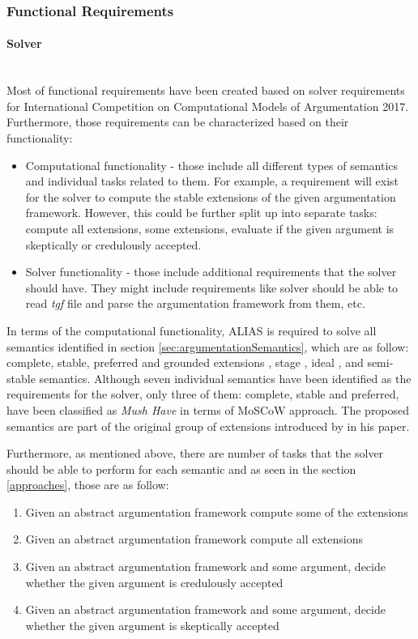 \subsubsection{Functional Requirements}

\paragraph{Solver} \mbox{} \\

Most of functional requirements have been created based on solver requirements for International Competition on Computational Models of Argumentation 2017. Furthermore, those requirements can be characterized based on their functionality:
\begin{itemize}
	\item Computational functionality - those include all different types of semantics and individual tasks related to them. For example, a requirement will exist for the solver to compute the stable extensions of the given argumentation framework. However, this could be further split up into separate tasks: compute all extensions, some extensions, evaluate if the given argument is skeptically or credulously accepted.
	\item Solver functionality - those include additional requirements that the solver should have. They might include requirements like solver should be able to read \textit{tgf} file and parse the argumentation framework from them, etc.
\end{itemize}

In terms of the computational functionality, ALIAS is required to solve all semantics identified in section \ref{sec:argumentationSemantics}, which are as follow: complete, stable, preferred and grounded extensions \citep{dung1995}, stage \citep{verheij1996two}, ideal \citep{dung2007computing}, and semi-stable \citep{caminada2006semi} semantics. Although seven individual semantics have been identified as the requirements for the solver, only three of them: complete, stable and preferred, have been classified as \textit{Mush Have} in terms of MoSCoW approach. The proposed semantics are part of the original group of extensions introduced by \citet{dung1995} in his paper. 

Furthermore, as mentioned above, there are number of tasks that the solver should be able to perform for each semantic and as seen in the section \ref{approaches}, those are as follow:
\begin{enumerate}
	\item Given an abstract argumentation framework compute some of the extensions
	\item Given an abstract argumentation framework compute all extensions
	\item Given an abstract argumentation framework and some argument, decide whether the given argument is credulously accepted
	\item Given an abstract argumentation framework and some argument, decide whether the given argument is skeptically accepted
\end{enumerate}

